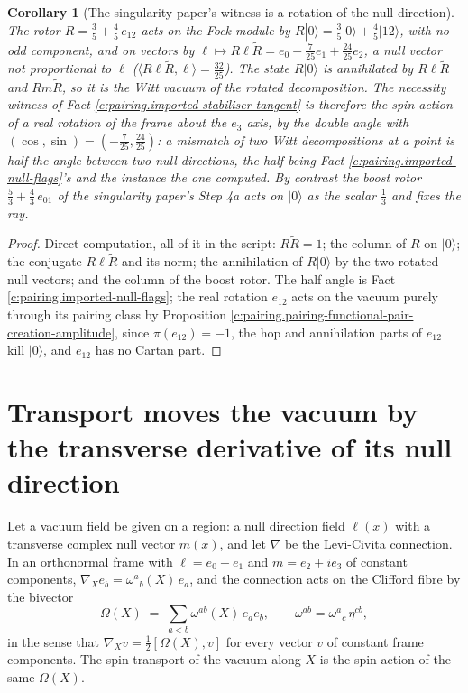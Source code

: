 \documentclass[11pt]{article}
\newtheorem{corollary}[theorem]{Corollary}
\theoremstyle{definition}
\theoremstyle{plain}
\providecommand{\pv}{}\renewcommand{\pv}{\pi}
\providecommand{\ip}{}\renewcommand{\ip}[2]{\langle #1, #2\rangle}
\providecommand{\ket}{}\renewcommand{\ket}[1]{|#1\rangle}
\begin{document}
\begin{corollary}[The singularity paper's witness is a rotation of the null direction]\label{c:pairing.singularity-papers-witness-rotation-null-direction}
The rotor $R = \tfrac35 + \tfrac45\, e_{12}$ acts on the Fock module by $R\ket{0} = \tfrac35\ket{0} + \tfrac45\ket{12}$, with no odd component, and on vectors by $\ell \mapsto R\ell\tilde R = e_{0} - \tfrac{7}{25}e_{1} + \tfrac{24}{25}e_{2}$, a null vector not proportional to $\ell$ ($\ip{R\ell\tilde R}{\ell} = \tfrac{32}{25}$). The state $R\ket{0}$ is annihilated by $R\ell\tilde R$ and $Rm\tilde R$, so it is the Witt vacuum of the rotated decomposition. The necessity witness of Fact \ref{c:pairing.imported-stabiliser-tangent} is therefore the spin action of a real rotation of the frame about the $e_{3}$ axis, by the double angle with $(\cos, \sin) = (-\tfrac{7}{25}, \tfrac{24}{25})$: a mismatch of two Witt decompositions at a point is half the angle between two null directions, the half being Fact \ref{c:pairing.imported-null-flags}'s and the instance the one computed. By contrast the boost rotor $\tfrac53 + \tfrac43\,e_{01}$ of the singularity paper's Step 4a acts on $\ket{0}$ as the scalar $\tfrac13$ and fixes the ray.
\end{corollary}
\begin{proof}
Direct computation, all of it in the script: $R\tilde R = 1$; the column of $R$ on $\ket{0}$; the conjugate $R\ell\tilde R$ and its norm; the annihilation of $R\ket{0}$ by the two rotated null vectors; and the column of the boost rotor. The half angle is Fact \ref{c:pairing.imported-null-flags}; the real rotation $e_{12}$ acts on the vacuum purely through its pairing class by Proposition \ref{c:pairing.pairing-functional-pair-creation-amplitude}, since $\pv(e_{12}) = -1$, the hop and annihilation parts of $e_{12}$ kill $\ket{0}$, and $e_{12}$ has no Cartan part.

\end{proof}

\section{Transport moves the vacuum by the transverse derivative of its null direction}

\label{c:note.pairing.setting-transport-moves-vacuum-transverse-derivative}
Let a vacuum field be given on a region: a null direction field $\ell(x)$ with a transverse complex null vector $m(x)$, and let $\nabla$ be the Levi-Civita connection. In an orthonormal frame with $\ell = e_{0} + e_{1}$ and $m = e_{2} + ie_{3}$ of constant components, $\nabla_{X} e_{b} = \omega^{a}{}_{b}(X)\,e_{a}$, and the connection acts on the Clifford fibre by the bivector
\[
\Omega(X) \;=\; \sum_{a<b}\omega^{ab}(X)\,e_{a}e_{b}, \qquad \omega^{ab} = \omega^{a}{}_{c}\,\eta^{cb},
\]
in the sense that $\nabla_{X} v = \tfrac12[\Omega(X), v]$ for every vector $v$ of constant frame components. The spin transport of the vacuum along $X$ is the spin action of the same $\Omega(X)$.
\end{document}
